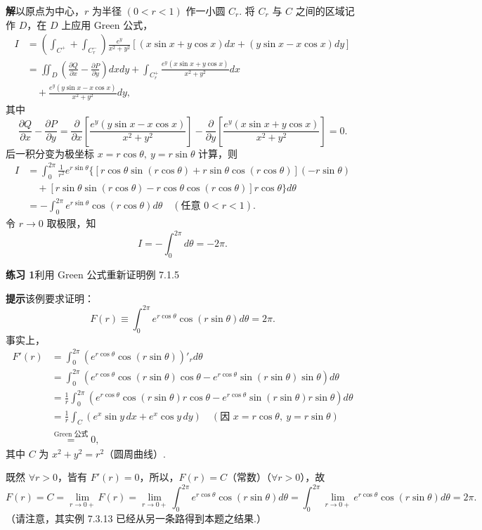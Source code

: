 \documentclass[UTF8, 12pt, fontset=fandol, oneside]{ctexart}
\providecommand{\xlongequal}[1]{\overset{#1}{=}}
\begin{document}
\noindent\textbf{解}\quad 以原点为中心，$r$ 为半径 $(0<r<1)$ 作一小圆 $C_r$. 将 $C_r$ 与 $C$ 之间的区域记作 $D$，在 $D$ 上应用 Green 公式，
\[
\begin{aligned}
I&=\left(\int_{C^+}+\int_{C_r^-}\right)
\frac{e^y}{x^2+y^2}
[(x\sin x+y\cos x)dx+(y\sin x-x\cos x)dy]\\
&=\iint_D\left(\frac{\partial Q}{\partial x}-\frac{\partial P}{\partial y}\right)dxdy
+\int_{C_r^+}\frac{e^y(x\sin x+y\cos x)}{x^2+y^2}dx\\
&\quad+\frac{e^y(y\sin x-x\cos x)}{x^2+y^2}dy,
\end{aligned}
\]
其中
\[
\frac{\partial Q}{\partial x}-\frac{\partial P}{\partial y}
=\frac{\partial}{\partial x}\left[\frac{e^y(y\sin x-x\cos x)}{x^2+y^2}\right]
-\frac{\partial}{\partial y}\left[\frac{e^y(x\sin x+y\cos x)}{x^2+y^2}\right]=0.
\]
后一积分变为极坐标 $x=r\cos\theta,\ y=r\sin\theta$ 计算，则
\[
\begin{aligned}
I&=\int_0^{2\pi}\frac1{r^2}e^{r\sin\theta}
\{[r\cos\theta\sin(r\cos\theta)+r\sin\theta\cos(r\cos\theta)](-r\sin\theta)\\
&\quad+[r\sin\theta\sin(r\cos\theta)-r\cos\theta\cos(r\cos\theta)]r\cos\theta\}d\theta\\
&=-\int_0^{2\pi}e^{r\sin\theta}\cos(r\cos\theta)d\theta
\quad(\text{任意 }0<r<1).
\end{aligned}
\]
令 $r\to0$ 取极限，知
\[
I=-\int_0^{2\pi}d\theta=-2\pi.
\]

\noindent\textbf{练习 1}\quad 利用 Green 公式重新证明例 7.1.5

\noindent\textbf{提示}\quad 该例要求证明：
\[
F(r)\equiv\int_0^{2\pi}e^{r\cos\theta}\cos(r\sin\theta)d\theta=2\pi.
\]
事实上，
\[
\begin{aligned}
F'(r)
&=\int_0^{2\pi}(e^{r\cos\theta}\cos(r\sin\theta))'_r d\theta\\
&=\int_0^{2\pi}(e^{r\cos\theta}\cos(r\sin\theta)\cos\theta
-e^{r\cos\theta}\sin(r\sin\theta)\sin\theta)d\theta\\
&=\frac1r\int_0^{2\pi}(e^{r\cos\theta}\cos(r\sin\theta)r\cos\theta
-e^{r\cos\theta}\sin(r\sin\theta)r\sin\theta)d\theta\\
&=\frac1r\int_C(e^x\sin y\,dx+e^x\cos y\,dy)\quad
(\text{因 }x=r\cos\theta,\ y=r\sin\theta)\\
&\xlongequal{\text{Green 公式}}0,
\end{aligned}
\]
其中 $C$ 为 $x^2+y^2=r^2$（圆周曲线）.

既然 $\forall r>0$，皆有 $F'(r)=0$，所以，$F(r)=C$（常数）（$\forall r>0$），故
\[
F(r)=C=\lim_{r\to0+}F(r)
=\lim_{r\to0+}\int_0^{2\pi}e^{r\cos\theta}\cos(r\sin\theta)d\theta
=\int_0^{2\pi}\lim_{r\to0+}e^{r\cos\theta}\cos(r\sin\theta)d\theta=2\pi.
\]
（请注意，其实例 7.3.13 已经从另一条路得到本题之结果.）
\end{document}
